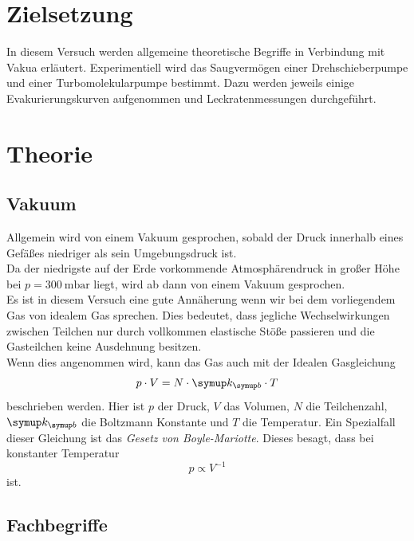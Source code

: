 \section{Zielsetzung}

	In diesem Versuch werden allgemeine theoretische Begriffe in Verbindung mit Vakua erläutert.
	Experimentiell wird das Saugvermögen einer Drehschieberpumpe und einer Turbomolekularpumpe bestimmt.
	Dazu werden jeweils einige Evakurierungskurven aufgenommen und Leckratenmessungen durchgeführt.

\section{Theorie}
	
	\subsection{Vakuum}
		
		Allgemein wird von einem Vakuum gesprochen, sobald der Druck innerhalb eines Gefäßes niedriger als sein Umgebungsdruck ist.\\
		Da der niedrigste auf der Erde vorkommende Atmosphärendruck in großer Höhe bei $p = \SI{300}{\milli\bar}$ liegt, wird ab dann von einem Vakuum gesprochen.\\
		Es ist in diesem Versuch eine gute Annäherung wenn wir bei dem vorliegendem Gas von idealem Gas sprechen. 
		Dies bedeutet, dass jegliche Wechselwirkungen zwischen Teilchen nur durch vollkommen elastische Stöße passieren und die Gasteilchen keine Ausdehnung besitzen.\\
		Wenn dies angenommen wird, kann das Gas auch mit der Idealen Gasgleichung
		\begin{equation}
			p \cdot V = N \cdot \symup k _{\symup b} \cdot T
		\end{equation}
		beschrieben werden.
		Hier ist $p$ der Druck, $V$ das Volumen, $N$ die Teilchenzahl, $\symup k _{\symup b}$ die Boltzmann Konstante und $T$ die Temperatur. 
		Ein Spezialfall dieser Gleichung ist das \textit{Gesetz von Boyle-Mariotte}. Dieses besagt, dass bei konstanter Temperatur
		\begin{equation}
			p \propto V^{-1}
		\end{equation}
		ist.

	\subsection{Fachbegriffe}

